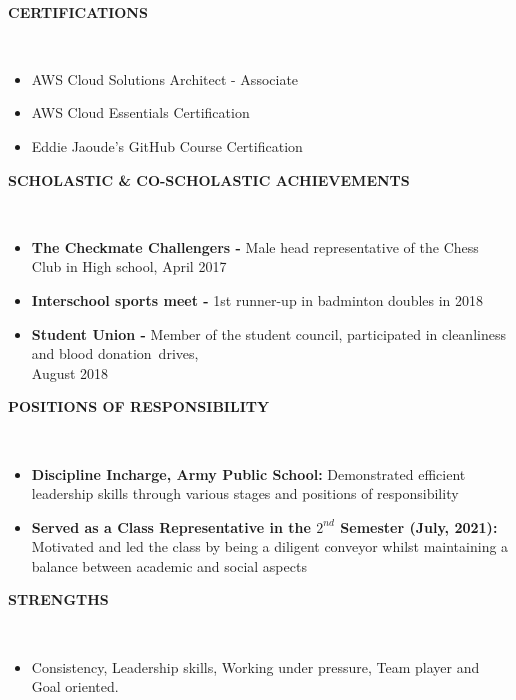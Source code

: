 \documentclass[a4paper,10pt]{article}
\newcommand{\lsep}{-0.5cm}
\newcommand{\resheading}[1]{{\small \colorbox{mygrey}{\begin{minipage}{0.975\textwidth}{\textbf{#1 \vphantom{p\^{E}}}}\end{minipage}}}}
\begin{document}
\hspace{0.5cm}\\[-0.2cm]

\resheading{\textbf{CERTIFICATIONS} }\\[\lsep]
\begin{itemize}
\setlength\itemsep{0em}
\item \noindent AWS Cloud Solutions Architect - Associate
\item \noindent AWS Cloud Essentials Certification
\item \noindent Eddie Jaoude's GitHub Course Certification
\\
\end{itemize}


\resheading{\textbf{SCHOLASTIC \& CO-SCHOLASTIC ACHIEVEMENTS} }\\[\lsep]
\begin{itemize}
\setlength\itemsep{0em}
\item \noindent \textbf{The Checkmate Challengers - }Male head representative of the Chess Club in High school, April 2017
\item \noindent\textbf{Interschool sports meet - }1st runner-up in badminton doubles in 2018
\item \noindent\textbf{Student Union - }Member of the student council, participated in cleanliness and blood donation drives, \\ August 2018

\end{itemize}

\resheading{\textbf{POSITIONS OF RESPONSIBILITY} }\\[\lsep]
\begin{itemize}
\setlength\itemsep{0em}
\item \noindent \textbf{Discipline Incharge, Army Public School:} Demonstrated efficient leadership skills through various stages and positions of responsibility
\item \noindent \textbf{Served as a Class Representative in the ${2^{nd}}$ Semester (July, 2021):}  Motivated and led the class by being a diligent conveyor whilst maintaining a balance between academic and social aspects

\end{itemize}

\resheading{\textbf{STRENGTHS} }\\[\lsep]
\begin{itemize}
\setlength\itemsep{0em}
\item  Consistency, Leadership skills, Working under pressure, Team player and Goal oriented.

\end{itemize}
\end{document}
